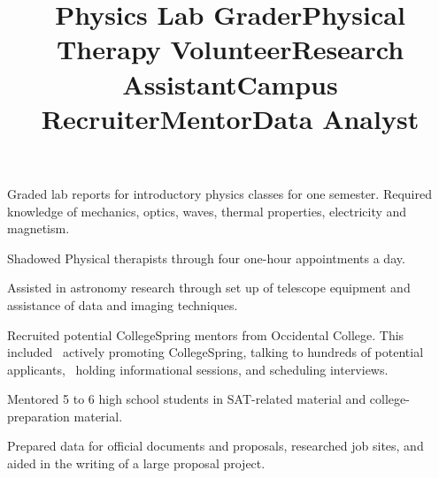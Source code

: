 \documentclass[margin]{res}
\begin{document}
\begin{resume}
\title{\textbf{Physics Lab Grader}}
\begin{position}
	Graded lab reports for introductory physics classes for one semester. Required knowledge of mechanics, optics, waves, thermal properties, electricity and magnetism.
\end{position}

\title{\textbf{Physical Therapy Volunteer}}
\begin{position}
	Shadowed Physical therapists through four one-hour appointments a day.
\end{position}

\title{\textbf{Research Assistant}}
\begin{position}
	Assisted in astronomy research through set up of telescope equipment and assistance of data and imaging techniques.
\end{position}

\title{\textbf{Campus Recruiter}}
\begin{position}
	Recruited potential CollegeSpring mentors from Occidental College. This included 
actively promoting CollegeSpring, talking to hundreds of potential applicants, 
holding informational sessions, and scheduling interviews.
\end{position}

\title{\textbf{Mentor}}
\begin{position}
	Mentored 5 to 6 high school students in SAT-related material and college-preparation material.
\end{position}

\title{\textbf{Data Analyst}}
\begin{position}
	Prepared data for official documents and proposals, researched job sites, and aided in the writing of a large proposal project.
\end{position}


\end{resume}
\end{document}
